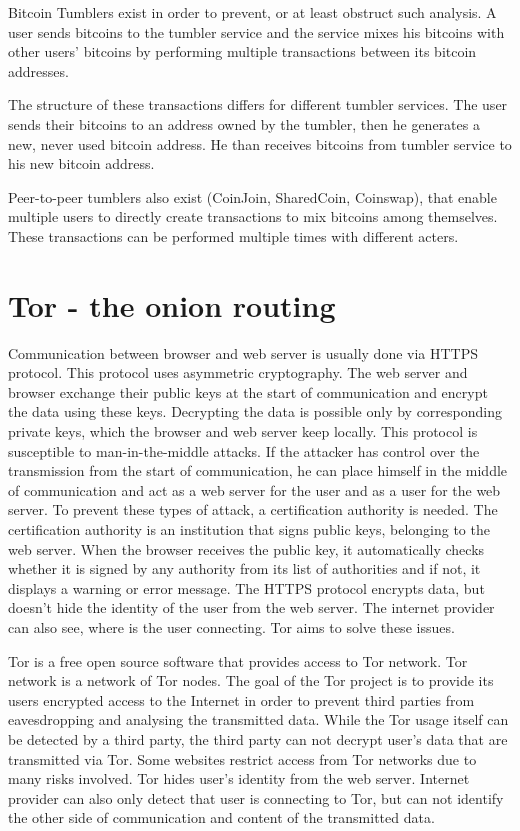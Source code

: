 \documentclass[
  digital, %
  table,   %
  lof,     %
  lot,     %
  oneside
]{fithesis3}
\begin{document}
Bitcoin Tumblers exist in order to prevent, or at least obstruct such analysis.
A user sends bitcoins to the tumbler service and the service mixes his bitcoins
with other users' bitcoins by performing multiple transactions
between its bitcoin addresses. \parencite{moser2013inquiry}
  
The structure of these transactions differs for different tumbler services.
The user sends their bitcoins to an address owned by the tumbler,
then he generates a new, never used bitcoin address.
He than receives bitcoins from tumbler service to his new bitcoin address.

Peer-to-peer tumblers also exist (CoinJoin, SharedCoin, Coinswap),
that enable multiple users to directly create transactions to mix bitcoins among themselves.
These transactions can be performed multiple times with different acters.

\section{Tor - the onion routing}

Communication between browser and web server is usually done via HTTPS protocol.
This protocol uses asymmetric cryptography. The web server and browser exchange their public keys at the start of communication
and encrypt the data using these keys. Decrypting the data is possible only by corresponding private keys,
which the browser and web server keep locally. This protocol is susceptible to man-in-the-middle attacks.
If the attacker has control over the transmission from the start of communication, he can place himself in the middle of communication and act as a web server for the user and as a user for the web server. To prevent these types of attack,
 a certification authority is needed. The certification authority is an institution that signs public keys, belonging to the web server.
 When the browser receives the public key, it automatically checks whether it is signed by any authority from its list of authorities and if not,
 it displays a warning or error message.
The HTTPS protocol encrypts data, but doesn't hide the identity of the user from the web server.
The internet provider can also see, where is the user connecting. Tor aims to solve these issues.
 
Tor \parencite{dingledine2004tor} is a free open source software that provides access to Tor network. Tor network is a network of Tor nodes.
The goal of the Tor project is to provide its users encrypted access to the Internet in order to prevent third parties
from eavesdropping and analysing the transmitted data.
While the Tor usage itself can be detected by a third party, the third party can not decrypt user's data that are transmitted
 via Tor. Some websites restrict access from Tor networks due to many risks involved.
Tor hides user's identity from the web server. Internet provider can also only detect that user is connecting to Tor,
but can not identify the other side of communication and content of the transmitted data.
\end{document}
